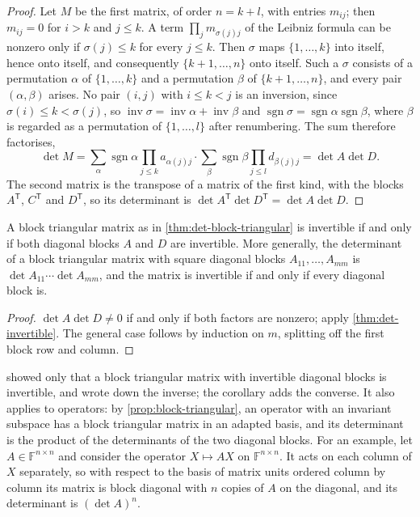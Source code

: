 \begin{proof}
Let $M$ be the first matrix, of order $n=k+l$, with entries $m_{ij}$; then $m_{ij}=0$ for $i>k$ and $j\le k$. A term $\prod_jm_{\sigma(j)j}$ of the Leibniz formula can be nonzero only if $\sigma(j)\le k$ for every $j\le k$. Then $\sigma$ maps $\{1,\ldots,k\}$ into itself, hence onto itself, and consequently $\{k+1,\ldots,n\}$ onto itself. Such a $\sigma$ consists of a permutation $\alpha$ of $\{1,\ldots,k\}$ and a permutation $\beta$ of $\{k+1,\ldots,n\}$, and every pair $(\alpha,\beta)$ arises. No pair $(i,j)$ with $i\le k<j$ is an inversion, since $\sigma(i)\le k<\sigma(j)$, so $\operatorname{inv}\sigma=\operatorname{inv}\alpha+\operatorname{inv}\beta$ and $\operatorname{sgn}\sigma=\operatorname{sgn}\alpha\operatorname{sgn}\beta$, where $\beta$ is regarded as a permutation of $\{1,\ldots,l\}$ after renumbering. The sum therefore factorises,
\[
\det M=\sum_\alpha\operatorname{sgn}\alpha\prod_{j\le k}a_{\alpha(j)j}\cdot\sum_\beta\operatorname{sgn}\beta\prod_{j\le l}d_{\beta(j)j}=\det A\det D .
\]
The second matrix is the transpose of a matrix of the first kind, with the blocks $A^{\mathsf T}$, $C^{\mathsf T}$ and $D^{\mathsf T}$, so its determinant is $\det A^{\mathsf T}\det D^{\mathsf T}=\det A\det D$.
\end{proof}

\begin{corollary}
\label{cor:block-triangular-invertible}
A block triangular matrix as in \cref{thm:det-block-triangular} is invertible if and only if both diagonal blocks $A$ and $D$ are invertible. More generally, the determinant of a block triangular matrix with square diagonal blocks $A_{11},\ldots,A_{mm}$ is $\det A_{11}\cdots\det A_{mm}$, and the matrix is invertible if and only if every diagonal block is.
\end{corollary}

\begin{proof}
$\det A\det D\ne0$ if and only if both factors are nonzero; apply \cref{thm:det-invertible}. The general case follows by induction on $m$, splitting off the first block row and column.
\end{proof}

 showed only that a block triangular matrix with invertible diagonal blocks is invertible, and wrote down the inverse; the corollary adds the converse. It also applies to operators: by \cref{prop:block-triangular}, an operator with an invariant subspace has a block triangular matrix in an adapted basis, and its determinant is the product of the determinants of the two diagonal blocks. For an example, let $A\in\mathbb F^{n\times n}$ and consider the operator $X\mapsto AX$ on $\mathbb F^{n\times n}$. It acts on each column of $X$ separately, so with respect to the basis of matrix units ordered column by column its matrix is block diagonal with $n$ copies of $A$ on the diagonal, and its determinant is $(\det A)^n$.


